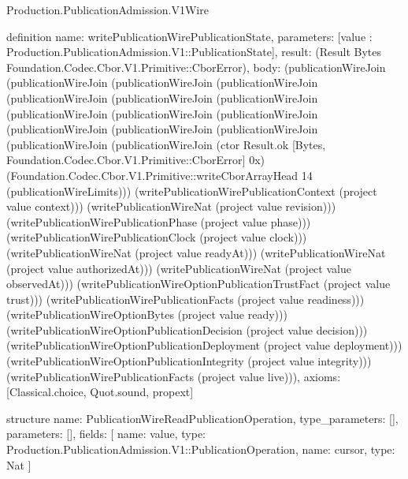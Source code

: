 \begin{lexlean}{Production.PublicationAdmission.V1Wire}
\begin{semanticmodule}
definition{
  name: writePublicationWirePublicationState,
  parameters: [value : Production.PublicationAdmission.V1::PublicationState],
  result: (Result Bytes Foundation.Codec.Cbor.V1.Primitive::CborError),
  body: (publicationWireJoin (publicationWireJoin (publicationWireJoin (publicationWireJoin (publicationWireJoin (publicationWireJoin (publicationWireJoin (publicationWireJoin (publicationWireJoin (publicationWireJoin (publicationWireJoin (publicationWireJoin (publicationWireJoin (publicationWireJoin (publicationWireJoin (ctor Result.ok [Bytes, Foundation.Codec.Cbor.V1.Primitive::CborError] 0x) (Foundation.Codec.Cbor.V1.Primitive::writeCborArrayHead 14 (publicationWireLimits))) (writePublicationWirePublicationContext (project value context))) (writePublicationWireNat (project value revision))) (writePublicationWirePublicationPhase (project value phase))) (writePublicationWirePublicationClock (project value clock))) (writePublicationWireNat (project value readyAt))) (writePublicationWireNat (project value authorizedAt))) (writePublicationWireNat (project value observedAt))) (writePublicationWireOptionPublicationTrustFact (project value trust))) (writePublicationWirePublicationFacts (project value readiness))) (writePublicationWireOptionBytes (project value ready))) (writePublicationWireOptionPublicationDecision (project value decision))) (writePublicationWireOptionPublicationDeployment (project value deployment))) (writePublicationWireOptionPublicationIntegrity (project value integrity))) (writePublicationWirePublicationFacts (project value live))),
  axioms: [Classical.choice, Quot.sound, propext]
}

structure{
  name: PublicationWireReadPublicationOperation,
  type_parameters: [],
  parameters: [],
  fields: [
    {name: value, type: Production.PublicationAdmission.V1::PublicationOperation},
    {name: cursor, type: Nat}
  ]
}


\end{semanticmodule}
\end{lexlean}
